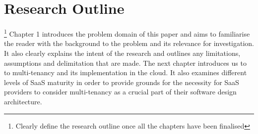 \section{Research Outline} \footnote{Clearly define the research outline once all the chapters have been finalised}
Chapter 1 introduces the problem domain of this paper and aims to familiarise the reader with the background to the problem and its relevance for investigation. It also clearly explains the intent of the research and outlines any limitations, assumptions and delimitation that are made. The next chapter introduces us to to multi-tenancy and its implementation in the cloud. It also examines different levels of SaaS maturity in order to provide grounds for the necessity for SaaS providers to consider multi-tenancy as a crucial part of their software design architecture.
